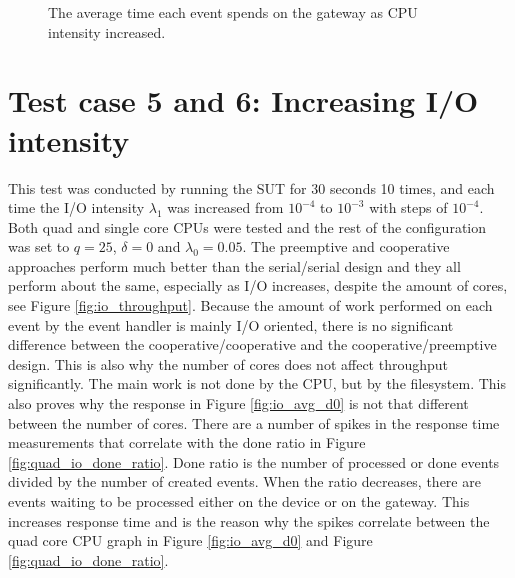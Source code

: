 \begin{figure}[h!]
    \centering

    \caption[Time on gateway when CPU intensity was increased.]{The average
    time each event spends on the gateway as CPU intensity increased.}

    \label{fig:cpu_avg_d2}
\end{figure}

\section{Test case 5 and 6: Increasing I/O intensity}

This test was conducted by running the SUT for 30 seconds 10 times, and each
time the I/O intensity $\lambda_1$ was increased from $10^{-4}$ to $10^{-3}$
with steps of $10^{-4}$. Both quad and single core CPUs were tested and the
rest of the configuration was set to $q = 25$, $\delta = 0$ and $\lambda_0 =
0.05$. The preemptive and cooperative approaches perform much better than the
serial/serial design and they all perform about the same, especially as I/O
increases, despite the amount of cores, see Figure \ref{fig:io_throughput}.
Because the amount of work performed on each event by the event handler is
mainly I/O oriented, there is no significant difference between the
cooperative/cooperative and the cooperative/preemptive design. This is also why
the number of cores does not affect throughput significantly. The main work is
not done by the CPU, but by the filesystem. This also proves why the response
in Figure \ref{fig:io_avg_d0} is not that different between the number of
cores. There are a number of spikes in the response time measurements that
correlate with the done ratio in Figure \ref{fig:quad_io_done_ratio}. Done
ratio is the number of processed or done events divided by the number of
created events.  When the ratio decreases, there are events waiting to be
processed either on the device or on the gateway. This increases response time
and is the reason why the spikes correlate between the quad core CPU graph in
Figure \ref{fig:io_avg_d0} and Figure \ref{fig:quad_io_done_ratio}.

